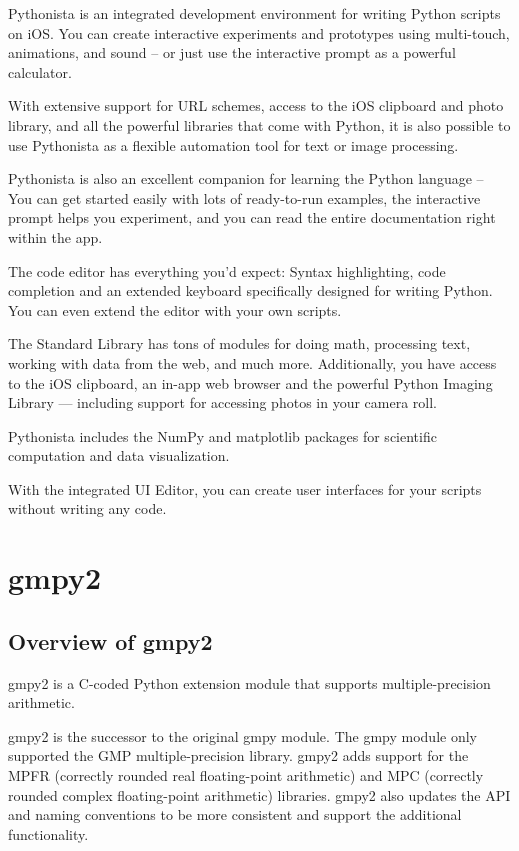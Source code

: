 Pythonista is an integrated development environment for writing Python scripts on iOS. You can create interactive experiments and prototypes using multi-touch, animations, and sound – or just use the interactive prompt as a powerful calculator.

With extensive support for URL schemes, access to the iOS clipboard and photo library, and all the powerful libraries that come with Python, it is also possible to use Pythonista as a flexible automation tool for text or image processing.

Pythonista is also an excellent companion for learning the Python language – You can get started easily with lots of ready-to-run examples, the interactive prompt helps you experiment, and you can read the entire documentation right within the app.

The code editor has everything you'd expect: Syntax highlighting, code completion and an extended keyboard specifically designed for writing Python. You can even extend the editor with your own scripts.

The Standard Library has tons of modules for doing math, processing text, working with data from the web, and much more. Additionally, you have access to the iOS clipboard, an in-app web browser and the powerful Python Imaging Library — including support for accessing photos in your camera roll.

Pythonista includes the NumPy and matplotlib packages for scientific computation and data visualization. 

With the integrated UI Editor, you can create user interfaces for your scripts without writing any code.



\chapter{gmpy2}

\section{Overview of gmpy2}
\label{gmpy2}

gmpy2 is a C-coded Python extension module that supports multiple-precision arithmetic.

gmpy2 is the successor to the original gmpy module. The gmpy module only supported the
GMP multiple-precision library. gmpy2 adds support for the MPFR (correctly rounded real
floating-point arithmetic) and MPC (correctly rounded complex floating-point arithmetic)
libraries. gmpy2 also updates the API and naming conventions to be more consistent and
support the additional functionality.

